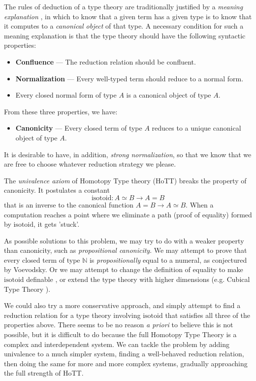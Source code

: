 \documentclass[a4paper,UKenglish]{lipics-v2016}
\newcommand*{\isotoid}{\ensuremath{\mathrm{isotoid}}}
\theoremstyle{plain}
\theoremstyle{definition}
\begin{document}
The rules of deduction of a type theory are traditionally justified by a \emph{meaning explanation} \cite{ML:ITT}, in which to know that a given term has a given type is to know that it computes to a \emph{canonical object} of that type.  A necessary condition for such a meaning explanation is that the type theory should have the following syntactic properties:
\begin{itemize}
\item \textbf{Confluence} --- The reduction relation should be confluent.
\item \textbf{Normalization} --- Every well-typed term should reduce to a normal form.
\item Every closed normal form of type $A$ is a canonical object of type $A$.
\end{itemize}
From these three properties, we have:
\begin{itemize}
\item \textbf{Canonicity} --- Every closed term of type $A$ reduces to a unique canonical object of type $A$.
\end{itemize}

It is desirable to have, in addition, \emph{strong normalization}, so that we know that we are free to choose whatever reduction strategy we please.

The \emph{univalence axiom} of Homotopy Type theory (HoTT) \cite{hottbook} breaks the property of canonicity.  It postulates a
constant
\[ \isotoid : A \simeq B \rightarrow A = B \]
that is an inverse to the canonical function $A = B \rightarrow A \simeq B$.  When a computation reaches a point
where we eliminate a path (proof of equality) formed by $\isotoid$, it gets 'stuck'.

As possible solutions to this problem, we may try to do with a weaker property than canonicity, such as \emph{propositional canonicity}.
We may attempt to prove that every closed term of type $\mathbb{N}$ is \emph{propositionally} equal to a numeral, as conjectured by Voevodsky.  Or we may attempt to change the definition of equality to make $\isotoid$ definable \cite{Polonsky14a}, or extend the type theory with higher dimensions (e.g. Cubical Type Theory \cite{cchm:cubical}).

We could also try a more conservative approach, and simply attempt to find a reduction relation for a type theory involving $\isotoid$ that satisfies
all three of the properties above.  There seems to be no reason \emph{a priori} to believe this is not possible, but it is difficult to do because
the full Homotopy Type Theory is a complex and interdependent system.  We can tackle the problem by adding univalence to a much simpler system, finding
a well-behaved reduction relation, then doing the same for more and more complex systems, gradually approaching the full strength of HoTT.
\end{document}
